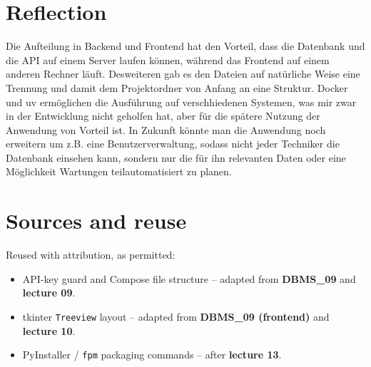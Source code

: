 \documentclass[11pt,a4paper]{article}
\begin{document}
\section{Reflection}

Die Aufteilung in Backend und Frontend hat den Vorteil, dass die Datenbank und die API auf einem Server laufen können, 
während das Frontend auf einem anderen Rechner läuft. Desweiteren gab es den Dateien auf natürliche Weise eine Trennung und 
damit dem Projektordner von Anfang an eine Struktur. Docker und uv ermöglichen die Ausführung auf verschhiedenen Systemen, was
mir zwar in der Entwicklung nicht geholfen hat, aber für die spätere Nutzung der Anwendung von Vorteil ist. In Zukunft könnte
man die Anwendung noch erweitern um z.B. eine Benutzerverwaltung, sodass nicht jeder Techniker die Datenbank einsehen kann, 
sondern nur die für ihn relevanten Daten oder eine Möglichkeit Wartungen teilautomatisiert zu planen.

\section*{Sources and reuse}

Reused with attribution, as permitted:
\begin{itemize}[leftmargin=1.4em, topsep=2pt]
  \item API-key guard and Compose file structure -- adapted from
        \textbf{DBMS\_09} and \textbf{lecture 09}.
  \item tkinter \texttt{Treeview} layout -- adapted from
        \textbf{DBMS\_09 (frontend)} and \textbf{lecture 10}.
  \item PyInstaller / \texttt{fpm} packaging commands -- after \textbf{lecture
        13}.
\end{itemize}
\end{document}
